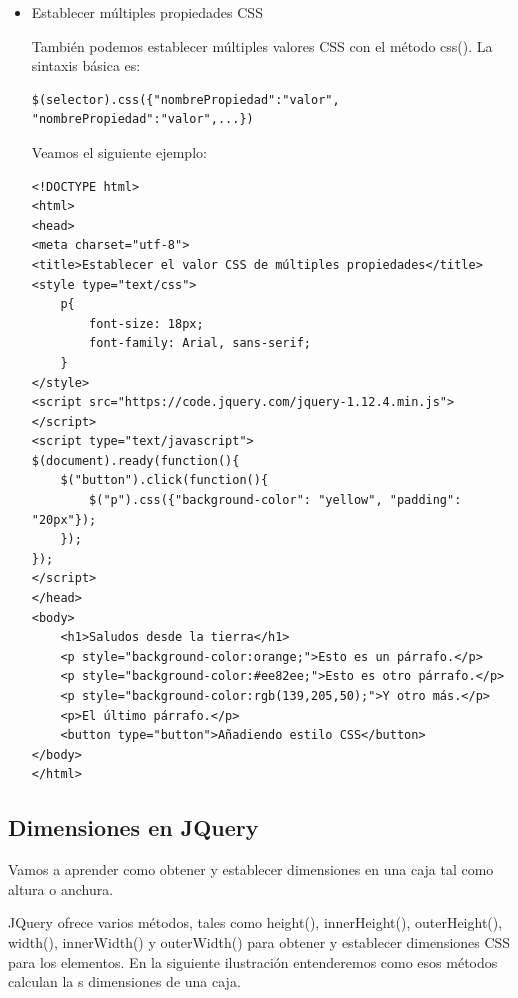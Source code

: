 \documentclass[11pt]{article}
\begin{document}
\begin{itemize}
\item Establecer múltiples propiedades CSS
\label{sec:org7af7704}

También podemos establecer múltiples valores CSS con el método css(). La sintaxis básica es:

\begin{verbatim}
$(selector).css({"nombrePropiedad":"valor", "nombrePropiedad":"valor",...})
\end{verbatim}

Veamos el siguiente ejemplo:

\begin{verbatim}
<!DOCTYPE html>
<html>
<head>
<meta charset="utf-8">
<title>Establecer el valor CSS de múltiples propiedades</title>
<style type="text/css">
    p{
        font-size: 18px;
        font-family: Arial, sans-serif;
    }
</style>
<script src="https://code.jquery.com/jquery-1.12.4.min.js"></script>
<script type="text/javascript">
$(document).ready(function(){
    $("button").click(function(){
        $("p").css({"background-color": "yellow", "padding": "20px"});
    });    
});
</script>
</head>
<body>
    <h1>Saludos desde la tierra</h1>
    <p style="background-color:orange;">Esto es un párrafo.</p>
    <p style="background-color:#ee82ee;">Esto es otro párrafo.</p>
    <p style="background-color:rgb(139,205,50);">Y otro más.</p>
    <p>El último párrafo.</p>
    <button type="button">Añadiendo estilo CSS</button>
</body>
</html>                                		
\end{verbatim}
\end{itemize}





\subsection*{Dimensiones en JQuery}
\label{sec:orgb76b183}

Vamos a aprender como obtener y establecer dimensiones en una caja tal como altura o anchura.

JQuery ofrece varios métodos, tales como height(), innerHeight(), outerHeight(), width(), innerWidth() y outerWidth() para obtener y establecer dimensiones CSS para los elementos. En la siguiente ilustración entenderemos como esos métodos calculan la s dimensiones de una caja.
\end{document}

